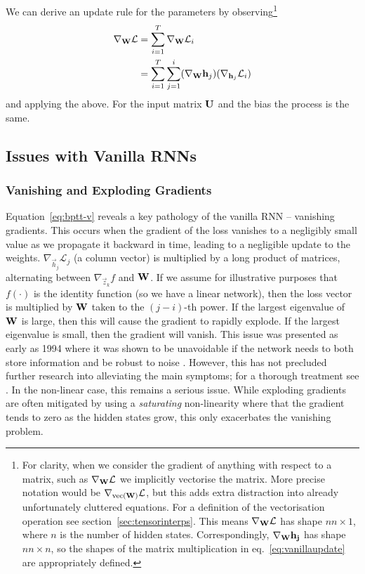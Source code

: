 We can derive an update rule for the parameters by observing\footnote{For clarity, when we
consider the gradient of anything with respect to a matrix, such as \(\nabla_{\mathbf{W}}\mathcal{L}\)
we implicitly vectorise the matrix. More precise notation would be
\(\nabla_{\operatorname{vec}(\mathbf{W})}\mathcal{L}\), but this adds extra distraction into already unfortunately
 cluttered equations. For a definition of the vectorisation operation see 
section~\ref{sec:tensorinterps}. This means \(\nabla_{\mathbf{W}}\mathcal{L}\) has shape \(nn \times 1\),
where \(n\) is the number of hidden states. Correspondingly, \(\nabla_{\mathbf{W}}\mathbf{h_j}\) has
shape \(nn \times n\), so the shapes of the matrix multiplication in eq.~\eqref{eq:vanillaupdate}
are appropriately defined.
}
\begin{align}
	\nabla_{\mathbf{W}} \mathcal{L} &= \sum_{i=1}^T \nabla_{\mathbf{W}} \mathcal{L}_i \\
	&= \sum_{i=1}^T\sum_{j=1}^i(\nabla_{\mathbf{W}} \mathbf{h}_j)(\nabla_{\mathbf{h}_j} \mathcal{L}_i )
	\label{eq:vanillaupdate}
\end{align} 
and applying the above. For the input matrix \(\mathbf{U}\) and the bias the process is the same.

\subsection{Issues with Vanilla RNNs}
\subsubsection{Vanishing and Exploding Gradients}
Equation~\eqref{eq:bptt-v} reveals a key pathology of the vanilla RNN -- vanishing gradients.
This occurs when the gradient of the loss vanishes to a negligibly small value as we
propagate it backward in time, leading to a negligible update to the weights.
 \(\nabla_{\vec{h}_j}\mathcal{L}_j\) (a column vector) is multiplied by a long product of
 matrices, alternating between \(\nabla_{\vec{z}_k} f\) and \(\mathbf{W}\). If we assume for
 illustrative purposes that \(f(\cdot)\) is the identity function (so we have a linear network),
then the loss vector is multiplied by \(\mathbf{W}\) taken to the \((j-i)\)-th power. If the largest
eigenvalue of \(\mathbf{W}\) is large, then this will cause the gradient to rapidly explode.
If the largest eigenvalue is small, then the gradient will vanish. This issue was presented
as early as 1994 where it was shown to be unavoidable if the network needs to both store
information and be robust to noise \autocite{Bengio1994}. 
However, this has not precluded further research into alleviating
the main symptoms; for a thorough treatment see \autocite{Pascanu2012}.
In the non-linear case, this remains a serious issue. While exploding gradients are often
mitigated by using a \emph{saturating} non-linearity where that the gradient tends to zero as the
hidden states grow, this only exacerbates the vanishing problem. 

